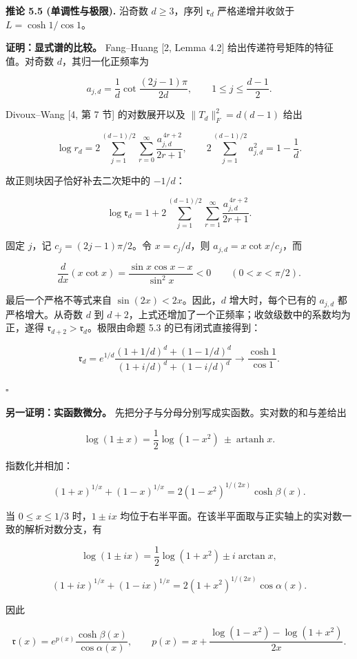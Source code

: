 \documentclass[11pt,a4paper]{article}
\begin{document}
\textbf{推论 5.5 (单调性与极限).} 沿奇数 \(d\ge3\)，序列 \(\mathfrak r_d\) 严格递增并收敛于 \(L=\cosh1/\cos1\)。

\textbf{证明：显式谱的比较。} Fang--Huang {[}2, Lemma 4.2{]} 给出传递符号矩阵的特征值。对奇数 \(d\)，其归一化正频率为

\[a_{j,d}=\frac1d\cot\frac{(2j-1)\pi}{2d},
\qquad 1\le j\le\frac{d-1}{2}.\]

Divoux--Wang {[}4, 第 7 节{]} 的对数展开以及 \(\|T_d\|_F^2=d(d-1)\) 给出

\[\log r_d
=2\sum_{j=1}^{(d-1)/2}\sum_{r=0}^{\infty}
\frac{a_{j,d}^{\,4r+2}}{2r+1},
\qquad
2\sum_{j=1}^{(d-1)/2}a_{j,d}^2=1-\frac1d.\]

故正则块因子恰好补去二次矩中的 \(-1/d\)：

\[\log\mathfrak r_d
=1+2\sum_{j=1}^{(d-1)/2}\sum_{r=1}^{\infty}
\frac{a_{j,d}^{\,4r+2}}{2r+1}.\]

固定 \(j\)，记 \(c_j=(2j-1)\pi/2\)。令 \(x=c_j/d\)，则 \(a_{j,d}=x\cot x/c_j\)，而

\[\frac{d}{dx}(x\cot x)
=\frac{\sin x\cos x-x}{\sin^2x}<0
\qquad(0<x<\pi/2).\]

最后一个严格不等式来自 \(\sin(2x)<2x\)。因此，\(d\) 增大时，每个已有的 \(a_{j,d}\) 都严格增大。从奇数 \(d\) 到 \(d+2\)，上式还增加了一个正频率；收敛级数中的系数均为正，遂得 \(\mathfrak r_{d+2}>\mathfrak r_d\)。极限由命题 5.3 的已有闭式直接得到：

\[\mathfrak r_d
=e^{1/d}\frac{(1+1/d)^d+(1-1/d)^d}
{(1+i/d)^d+(1-i/d)^d}
\longrightarrow\frac{\cosh1}{\cos1}.\]

\(\square\)

\textbf{另一证明：实函数微分。} 先把分子与分母分别写成实函数。实对数的和与差给出

\[\log(1\pm x)=\frac12\log(1-x^2)
\ \pm\operatorname{artanh}x.\]

指数化并相加：

\[(1+x)^{1/x}+(1-x)^{1/x}
=2(1-x^2)^{1/(2x)}\cosh\beta(x).\]

当 \(0\le x\le1/3\) 时，\(1\pm ix\) 均位于右半平面。在该半平面取与正实轴上的实对数一致的解析对数分支，有

\[\log(1\pm ix)=\frac12\log(1+x^2)\pm i\arctan x,\]

\[(1+ix)^{1/x}+(1-ix)^{1/x}
=2(1+x^2)^{1/(2x)}\cos\alpha(x).\]

因此

\[\mathfrak r(x)
=e^{p(x)}\frac{\cosh\beta(x)}{\cos\alpha(x)},\qquad
p(x)=x+\frac{\log(1-x^2)-\log(1+x^2)}{2x}.\]
\end{document}
